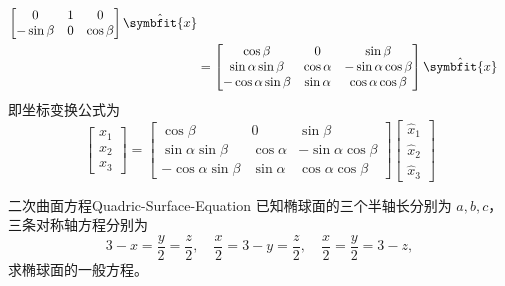 \begin{solution}
\begin{equation*}
\begin{aligned}
\begin{bmatrix}
                                              0          & 1 & 0         \\
                                              -\sin\beta & 0 & \cos\beta
                                          \end{bmatrix} \hat{\symbfit{x}}                \\
                        & = \begin{bmatrix}
                                \cos\beta            & 0          & \sin\beta            \\
                                \sin\alpha\sin\beta  & \cos\alpha & -\sin\alpha\cos\beta \\
                                -\cos\alpha\sin\beta & \sin\alpha & \cos\alpha\cos\beta
                            \end{bmatrix} \hat{\symbfit{x}}
        \end{aligned}
    \end{equation*}
    即坐标变换公式为
    \begin{equation*}
        \boxed{\begin{bmatrix} x_1 \\ x_2 \\ x_3 \end{bmatrix} = \begin{bmatrix} \cos\beta & 0 & \sin\beta \\ \sin\alpha\sin\beta & \cos\alpha & -\sin\alpha\cos\beta \\ -\cos\alpha\sin\beta & \sin\alpha & \cos\alpha\cos\beta \end{bmatrix} \begin{bmatrix} \hat{x}_1 \\ \hat{x}_2 \\ \hat{x}_3 \end{bmatrix}}
    \end{equation*}
\end{solution}


\begin{problem}{二次曲面方程}{Quadric-Surface-Equation}
    已知椭球面的三个半轴长分别为 $a,b,c$，三条对称轴方程分别为
    \begin{equation*}
        3 - x = \frac{y}{2} = \frac{z}{2}, \quad \frac{x}{2} = 3 - y = \frac{z}{2}, \quad \frac{x}{2} = \frac{y}{2} = 3 - z,
    \end{equation*}
    求椭球面的一般方程。
\end{problem}

